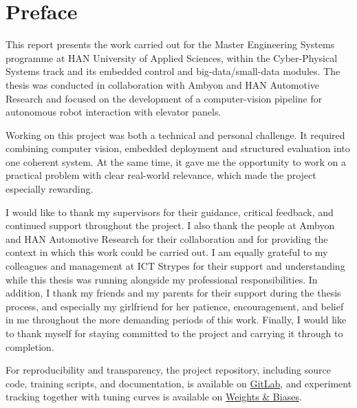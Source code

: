\chapter*{Preface}

This report presents the work carried out for the Master Engineering Systems
programme at HAN University of Applied Sciences, within the Cyber-Physical
Systems track and its embedded control and big-data/small-data modules. The
thesis was conducted in collaboration with Ambyon and HAN Automotive Research
and focused on the development of a computer-vision pipeline for autonomous
robot interaction with elevator panels.

Working on this project was both a technical and personal challenge. It required
combining computer vision, embedded deployment and
structured evaluation into one coherent system. At the same time, it gave me
the opportunity to work on a practical problem with clear real-world relevance,
which made the project especially rewarding.

I would like to thank my supervisors for their guidance, critical feedback, and
continued support throughout the project. I also thank the people at Ambyon and
HAN Automotive Research for their collaboration and for providing the context in
which this work could be carried out. I am equally grateful to my colleagues and
management at ICT Strypes for their support and understanding while this thesis
was running alongside my professional responsibilities. In addition, I thank my
friends and my parents for their support during the thesis process, and
especially my girlfriend for her patience, encouragement, and belief in me
throughout the more demanding periods of this work. Finally, I would like to
thank myself for staying committed to the project and carrying it through to
completion.

For reproducibility and transparency, the project repository, including source
code, training scripts, and documentation, is available on
\href{https://gitlab.com/han-automotive-research/carebots/master_thesis_carebot_2025}{GitLab},
and experiment tracking together with tuning curves is available on
\href{https://wandb.ai/pavelpetrovski333-han-university-of-applied-sciences/projects}{Weights \& Biases}.
